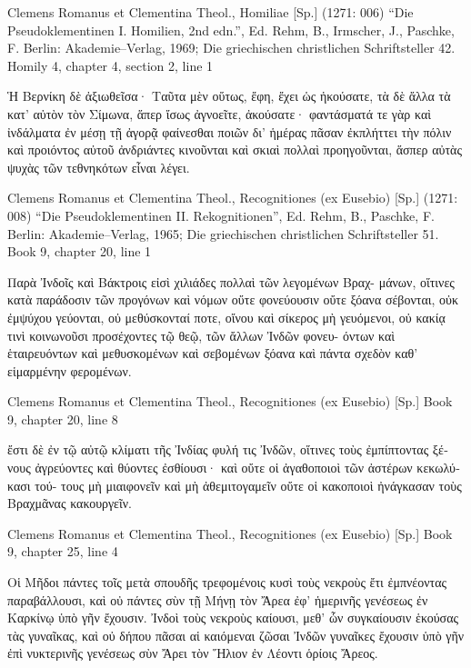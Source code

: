 \documentclass[12pt,letterpaper,twoside,final]{memoir}
\begin{document}
\begin{greek}
Clemens Romanus et Clementina Theol., Homiliae [Sp.] (1271: 006)
“Die Pseudoklementinen I. Homilien, 2nd edn.”, Ed. Rehm, B., Irmscher, J., Paschke, F.
Berlin: Akademie–Verlag, 1969; Die griechischen christlichen Schriftsteller 42.
Homily 4, chapter 4, section 2, line 1

Ἡ Βερνίκη δὲ ἀξιωθεῖσα· Ταῦτα μὲν οὕτως, ἔφη, ἔχει ὡς ἠκούσατε, 
τὰ δὲ ἄλλα τὰ κατ' αὐτὸν τὸν Σίμωνα, ἅπερ ἴσως ἀγνοεῖτε, ἀκούσατε· 
φαντάσματά τε γὰρ καὶ ἰνδάλματα ἐν μέσῃ τῇ ἀγορᾷ φαίνεσθαι ποιῶν δι' 
ἡμέρας πᾶσαν ἐκπλήττει τὴν πόλιν καὶ προιόντος αὐτοῦ ἀνδριάντες κινοῦνται 
καὶ σκιαὶ πολλαὶ προηγοῦνται, ἅσπερ αὐτὰς ψυχὰς τῶν τεθνηκότων εἶναι 
λέγει. 

Clemens Romanus et Clementina Theol., Recognitiones (ex Eusebio) [Sp.] (1271: 008)
“Die Pseudoklementinen II. Rekognitionen”, Ed. Rehm, B., Paschke, F.
Berlin: Akademie–Verlag, 1965; Die griechischen christlichen Schriftsteller 51.
Book 9, chapter 20, line 1

Παρὰ Ἰνδοῖς καὶ Βάκτροις εἰσὶ χιλιάδες πολλαὶ τῶν λεγομένων Βραχ-
μάνων, οἵτινες κατὰ παράδοσιν τῶν προγόνων καὶ νόμων οὔτε φονεύουσιν 
οὔτε ξόανα σέβονται, οὐκ ἐμψύχου γεύονται, οὐ μεθύσκονταί ποτε, οἴνου 
καὶ σίκερος μὴ γευόμενοι,   
οὐ κακίᾳ τινὶ κοινωνοῦσι προσέχοντες τῷ θεῷ, τῶν ἄλλων Ἰνδῶν φονευ-
όντων καὶ ἑταιρευόντων καὶ μεθυσκομένων καὶ σεβομένων ξόανα καὶ 
πάντα σχεδὸν καθ' εἱμαρμένην φερομένων. 



Clemens Romanus et Clementina Theol., Recognitiones (ex Eusebio) [Sp.] 
Book 9, chapter 20, line 8

                                             ἔστι δὲ ἐν τῷ αὐτῷ κλίματι 
τῆς Ἰνδίας φυλή τις Ἰνδῶν, οἵτινες τοὺς ἐμπίπτοντας ξένους ἀγρεύοντες 
καὶ θύοντες ἐσθίουσι· καὶ οὔτε οἱ ἀγαθοποιοὶ τῶν ἀστέρων κεκωλύκασι τού-
τους μὴ μιαιφονεῖν καὶ μὴ ἀθεμιτογαμεῖν οὔτε οἱ κακοποιοὶ ἠνάγκασαν τοὺς 
Βραχμᾶνας κακουργεῖν. 



Clemens Romanus et Clementina Theol., Recognitiones (ex Eusebio) [Sp.] 
Book 9, chapter 25, line 4

Οἱ Μῆδοι πάντες τοῖς μετὰ σπουδῆς τρεφομένοις κυσὶ τοὺς νεκροὺς   
ἔτι ἐμπνέοντας παραβάλλουσι, καὶ οὐ πάντες σὺν τῇ Μήνῃ τὸν Ἄρεα ἐφ' 
ἡμερινῆς γενέσεως ἐν Καρκίνῳ ὑπὸ γῆν ἔχουσιν. 
 Ἰνδοὶ τοὺς νεκροὺς καίουσι, μεθ' ὧν συγκαίουσιν ἑκούσας τὰς γυναῖκας, 
καὶ οὐ δήπου πᾶσαι αἱ καιόμεναι ζῶσαι Ἰνδῶν γυναῖκες ἔχουσιν ὑπὸ γῆν 
ἐπὶ νυκτερινῆς γενέσεως σὺν Ἄρει τὸν Ἥλιον ἐν Λέοντι ὁρίοις Ἄρεος. 




\end{greek}
\end{document}

